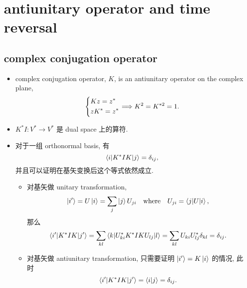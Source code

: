 \chapter{antiunitary operator and time reversal} \label{antiunitary operator and time reversal}
\section{complex conjugation operator}
\begin{itemize}
	\item complex conjugation operator, $K$, is an antiunitary operator on the complex plane,
	\begin{equation}
		\begin{dcases}
			K z = z^* \\
			z K^* = z^*
		\end{dcases} \Longrightarrow K^2 = K^{* 2} = 1.
	\end{equation}
	
	\item $K^* I : V^* \rightarrow V^*$ 是 dual space 上的算符.
	
	\item 对于一组 orthonormal basis, 有
	\begin{equation}
		\braket{i | K^* I K | j} = \delta_{i j},
	\end{equation}
	并且可以证明在基矢变换后这个等式依然成立.
	
	\begin{tcolorbox}[title=proof:]
		\begin{itemize}
			\item 对基矢做 unitary transformation,
			\begin{equation}
				\ket{i'} = U \ket{i} = \sum_j \ket{j} U_{j i} \quad \text{where} \quad U_{j i} = \braket{j | U | i},
			\end{equation}
			那么
			\begin{equation}
				\braket{i' | K^* I K | j'} = \sum_{k l} \braket{k | U^*_{k i} K^* I K U_{l j} | l} = \sum_{k l} U_{k i} U^*_{l j} \delta_{k l} = \delta_{i j}.
			\end{equation}
			
			\item 对基矢做 antiunitary transformation, 只需要证明 $\ket{i'} = K \ket{i}$ 的情况, 此时
			\begin{equation}
				\braket{i' | K^* I K | j'} = \braket{i | j} = \delta_{i j}.
			\end{equation}
		\end{itemize}
	\end{tcolorbox}
\end{itemize}


